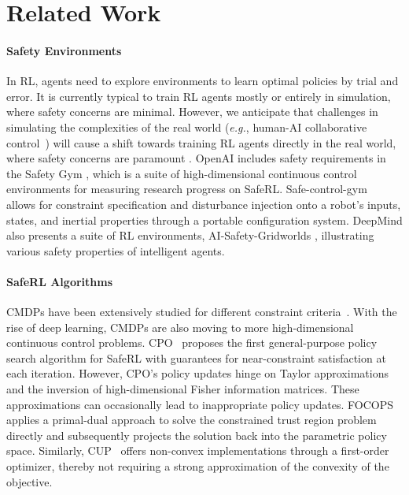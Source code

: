 \documentclass{article}
\begin{document}
\section{Related Work}
\paragraph{Safety Environments}
In RL, agents need to explore environments to learn optimal policies by trial and error. It is currently typical to train RL agents mostly or entirely in simulation, where safety concerns are minimal. However, we anticipate that challenges in simulating the complexities of the real world (\textit{e.g.}, human-AI collaborative control~\cite{carlson2010increasing, bi2021safety}) will cause a shift towards training RL agents directly in the real world, where safety concerns are paramount \cite{li2022metadrive, xu2022trustworthy, gu2022review}. OpenAI includes safety requirements in the Safety Gym \cite{ray2019benchmarking}, which is a suite of high-dimensional continuous control environments for measuring research progress on SafeRL. Safe-control-gym~\cite{yuan2022safe} allows for constraint specification and disturbance injection onto a robot’s inputs, states, and inertial properties through a portable configuration system. DeepMind also presents a suite of RL environments, AI-Safety-Gridworlds \cite{leike2017ai}, illustrating various safety properties of intelligent agents.

\paragraph{SafeRL Algorithms}
CMDPs have been extensively studied for different constraint criteria~\cite{tabular-cmdp-1983, garcia2015comprehensive, Dai_Ji_Yang_Zheng_Pan_2023, huang2023safedreamer}. 
With the rise of deep learning, CMDPs are also moving to more high-dimensional continuous control problems. 
CPO~\cite{achiam2017constrained} proposes the first general-purpose policy search algorithm for SafeRL with guarantees for near-constraint satisfaction at each iteration.
However, CPO's policy updates hinge on Taylor approximations and the inversion of high-dimensional Fisher information matrices. These approximations can occasionally lead to inappropriate policy updates. 
FOCOPS~\cite{zhang2020first} applies a primal-dual approach to solve the constrained trust region problem directly and subsequently projects the solution back into the parametric policy space.
Similarly, CUP~\cite{yang2022cup} offers non-convex implementations through a first-order optimizer, thereby not requiring a strong approximation of the convexity of the objective.
\end{document}
